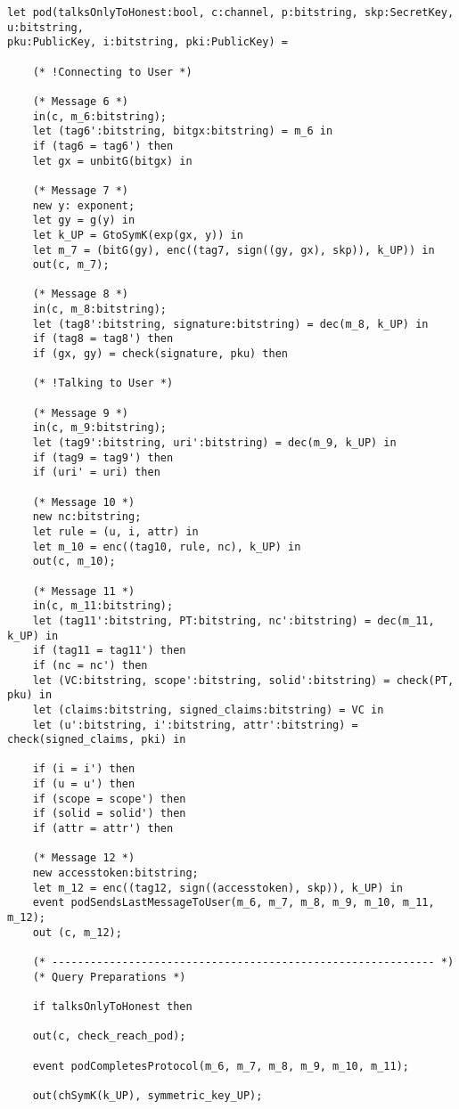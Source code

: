 \begin{Verbatim}[fontsize=\small]
let pod(talksOnlyToHonest:bool, c:channel, p:bitstring, skp:SecretKey, u:bitstring, 
pku:PublicKey, i:bitstring, pki:PublicKey) = 

    (* !Connecting to User *)

    (* Message 6 *)
    in(c, m_6:bitstring);
    let (tag6':bitstring, bitgx:bitstring) = m_6 in
    if (tag6 = tag6') then
    let gx = unbitG(bitgx) in

    (* Message 7 *)
    new y: exponent;
    let gy = g(y) in
    let k_UP = GtoSymK(exp(gx, y)) in
    let m_7 = (bitG(gy), enc((tag7, sign((gy, gx), skp)), k_UP)) in
    out(c, m_7);

    (* Message 8 *)
    in(c, m_8:bitstring);
    let (tag8':bitstring, signature:bitstring) = dec(m_8, k_UP) in
    if (tag8 = tag8') then
    if (gx, gy) = check(signature, pku) then

    (* !Talking to User *)

    (* Message 9 *)
    in(c, m_9:bitstring);
    let (tag9':bitstring, uri':bitstring) = dec(m_9, k_UP) in
    if (tag9 = tag9') then
    if (uri' = uri) then

    (* Message 10 *)
    new nc:bitstring;
    let rule = (u, i, attr) in
    let m_10 = enc((tag10, rule, nc), k_UP) in
    out(c, m_10);

    (* Message 11 *)
    in(c, m_11:bitstring);
    let (tag11':bitstring, PT:bitstring, nc':bitstring) = dec(m_11, k_UP) in
    if (tag11 = tag11') then
    if (nc = nc') then
    let (VC:bitstring, scope':bitstring, solid':bitstring) = check(PT, pku) in
    let (claims:bitstring, signed_claims:bitstring) = VC in
    let (u':bitstring, i':bitstring, attr':bitstring) = check(signed_claims, pki) in

    if (i = i') then
    if (u = u') then
    if (scope = scope') then
    if (solid = solid') then
    if (attr = attr') then

    (* Message 12 *)
    new accesstoken:bitstring;
    let m_12 = enc((tag12, sign((accesstoken), skp)), k_UP) in
    event podSendsLastMessageToUser(m_6, m_7, m_8, m_9, m_10, m_11, m_12);
    out (c, m_12);

    (* ------------------------------------------------------------ *)
    (* Query Preparations *)

    if talksOnlyToHonest then

    out(c, check_reach_pod);

    event podCompletesProtocol(m_6, m_7, m_8, m_9, m_10, m_11);

    out(chSymK(k_UP), symmetric_key_UP);


\end{Verbatim}
